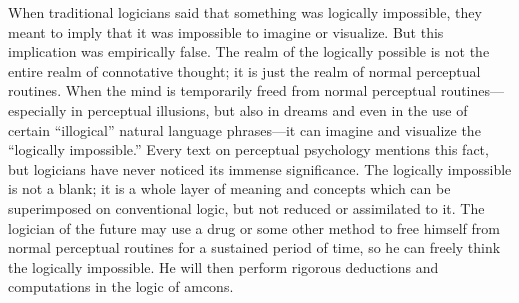 When traditional logicians said that something was logically impossible, 
they meant to imply that it was impossible to imagine or visualize. But this 
implication was empirically false. The realm of the logically possible is not 
the entire realm of connotative thought; it is just the realm of normal 
perceptual routines. When the mind is temporarily freed from normal 
perceptual routines---especially in perceptual illusions, but also in dreams and 
even in the use of certain \enquote{illogical} natural language phrases---it can imagine 
and visualize the \enquote{logically impossible.} Every text on perceptual 
psychology mentions this fact, but logicians have never noticed its immense 
significance. The logically impossible is not a blank; it is a whole layer of 
meaning and concepts which can be superimposed on conventional logic, but 
not reduced or assimilated to it. The logician of the future may use a drug or 
some other method to free himself from normal perceptual routines for a 
sustained period of time, so he can freely think the logically impossible. He 
will then perform rigorous deductions and computations in the logic of 
amcons. 


